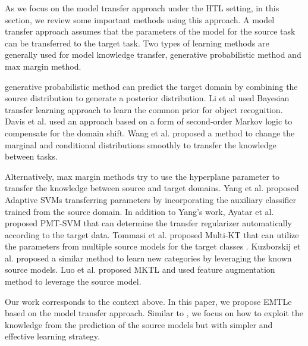 As we focus on the model transfer approach under the HTL setting, in this section, we review some important methods using this approach.
A model transfer approach assumes that the parameters of the model for the source task can be transferred to the target task. Two types of learning methods are generally used for model knowledge transfer, generative probabilistic method and max margin method.
 
generative probabilistic method can predict the target domain by combining the source distribution to generate a posterior distribution. Li et al \cite{fei2006one} used Bayesian transfer
learning approach to learn the common prior for object recognition. 
Davis et al.\cite{davis2009deep} used an approach based on a form of second-order Markov logic to compensate for the domain shift.
Wang et al.\cite{wang2014active} proposed a method to change the marginal and conditional distributions smoothly to transfer the knowledge between tasks. 

Alternatively, max margin methods try to use the hyperplane parameter to transfer the knowledge between source and target domains.
Yang et al.\cite{yang2007cross} proposed Adaptive SVMs transferring parameters by incorporating the auxiliary classifier trained from the source domain. 
In addition to Yang's work, Ayatar et al.\cite{aytar2011tabula} proposed PMT-SVM that can determine the transfer regularizer automatically according to the target data. 
Tommasi et al.\cite{tommasi2014learning} proposed Multi-KT that can utilize the parameters from multiple source models for the target classes .
Kuzborskij et al.\cite{kuzborskij2013n} proposed a similar method to learn new categories by leveraging the known source models.
Luo et al.\cite{jie2011multiclass} proposed MKTL and used feature augmentation method to leverage the source model.

Our work corresponds to the context above. In this paper, we propose EMTLe based on the model transfer approach. Similar to \cite{jie2011multiclass}, we focus on how to exploit the knowledge from the prediction of the source models but with simpler and effective learning strategy.
